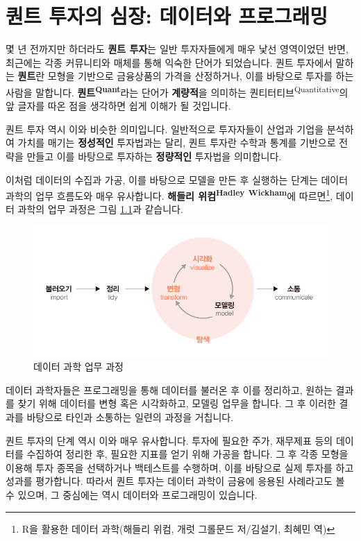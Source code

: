 \documentclass[12pt,]{book}
\let\rmarkdownfootnote\footnote%
\def\footnote{\protect\rmarkdownfootnote}
\begin{document}
\hypertarget{section-1}{%
\chapter{퀀트 투자의 심장: 데이터와 프로그래밍}\label{section-1}}

몇 년 전까지만 하더라도 \textbf{퀀트 투자}는 일반 투자자들에게 매우 낯선 영역이었던 반면, 최근에는 각종 커뮤니티와 매체를 통해 익숙한 단어가 되었습니다. 퀀트 투자에서 말하는 \textbf{퀀트}란 모형을 기반으로 금융상품의 가격을 산정하거나, 이를 바탕으로 투자를 하는 사람을 말합니다. \textbf{퀀트\textsuperscript{Quant}}라는 단어가 \textbf{계량적}을 의미하는 퀀티터티브\textsuperscript{Quantitative}의 앞 글자를 따온 점을 생각하면 쉽게 이해가 될 것입니다.

퀀트 투자 역시 이와 비슷한 의미입니다. 일반적으로 투자자들이 산업과 기업을 분석하여 가치를 매기는 \textbf{정성적인} 투자법과는 달리, 퀀트 투자란 수학과 통계를 기반으로 전략을 만들고 이를 바탕으로 투자하는 \textbf{정량적인} 투자법을 의미합니다.

이처럼 데이터의 수집과 가공, 이를 바탕으로 모델을 만든 후 실행하는 단계는 데이터 과학의 업무 흐름도와 매우 유사합니다. \textbf{해들리 위컴\textsuperscript{Hadley} \textsuperscript{Wickham}}에 따르면\footnote{R을 활용한 데이터 과학(해들리 위컴, 개럿 그롤문드 저/김설기, 최혜민 역)}, 데이터 과학의 업무 과정은 그림 \ref{fig:ds}과 같습니다.

\begin{figure}[h]

{\centering \includegraphics[width=0.7\linewidth]{images/ds_flow} 

}

\caption{데이터 과학 업무 과정}\label{fig:ds}
\end{figure}

데이터 과학자들은 프로그래밍을 통해 데이터를 불러온 후 이를 정리하고, 원하는 결과를 찾기 위해 데이터를 변형 혹은 시각화하고, 모델링 업무을 합니다. 그 후 이러한 결과를 바탕으로 타인과 소통하는 일련의 과정을 거칩니다.

퀀트 투자의 단계 역시 이와 매우 유사합니다. 투자에 필요한 주가, 재무제표 등의 데이터를 수집하여 정리한 후, 필요한 지표를 얻기 위해 가공을 합니다. 그 후 각종 모형을 이용해 투자 종목을 선택하거나 백테스트를 수행하며, 이를 바탕으로 실제 투자를 하고 성과를 평가합니다. 따라서 퀀트 투자는 데이터 과학이 금융에 응용된 사례라고도 볼 수 있으며, 그 중심에는 역시 데이터와 프로그래밍이 있습니다.
\end{document}
